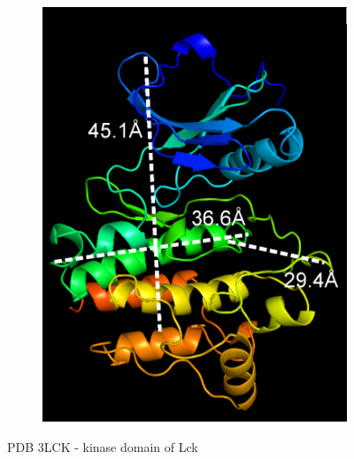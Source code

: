 \documentclass[../AdvancementSummary.tex]{subfiles}
\begin{document}
\begin{figure}[H]
\begin{center}
\begin{subfigure}{0.4\linewidth}
\includegraphics[width=\linewidth]{LckPyMol/LWD.eps}
\caption{}
\end{subfigure}
\end{center}
\caption{PDB 3LCK - kinase domain of Lck \label{fig: LckPyMol}}
\end{figure}



%
%
%
\end{document}
